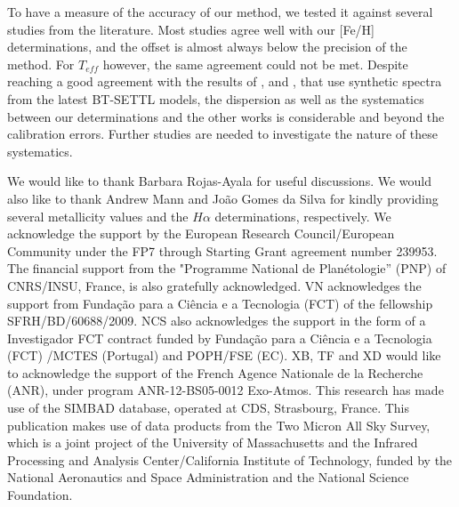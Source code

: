 \documentclass{aa}
\begin{document}
To have a measure of the accuracy of our method, we tested it against several studies from the literature. Most studies agree well with our [Fe/H] determinations, and the offset is almost always below the precision of the method. For $T_{eff}$ however, the same agreement could not be met. Despite reaching a good agreement with the results of \citet{Woolf-2005}, and \citet{Rajpurohit-2013a}, that use synthetic spectra from the latest BT-SETTL models, the dispersion as well as the systematics between our determinations and the other works is considerable and beyond the calibration errors. Further studies are needed to investigate the nature of these systematics. 










\begin{acknowledgements}
We would like to thank Barbara Rojas-Ayala for useful discussions. We would also like to thank Andrew Mann and Jo\~ao Gomes da Silva for kindly providing several metallicity values and the $H\alpha$ determinations, respectively. We acknowledge the support by the European Research Council/European Community under the FP7 through Starting Grant agreement number 239953. The financial support from the "Programme National de Plan\'etologie'' (PNP) of CNRS/INSU, France, is also gratefully acknowledged. VN acknowledges the support from Funda\c{c}\~ao para a Ci\^encia e a Tecnologia (FCT) of the fellowship SFRH/BD/60688/2009. NCS also acknowledges the support in the form of a Investigador FCT contract funded by Funda\c{c}\~ao para a Ci\^encia e a Tecnologia (FCT) /MCTES (Portugal) and POPH/FSE (EC). XB, TF and XD would like to acknowledge the support of the French Agence Nationale de la Recherche (ANR), under program ANR-12-BS05-0012 Exo-Atmos. This research has made use of the SIMBAD database, operated at CDS, Strasbourg, France. This publication makes use of data products from the Two Micron All Sky Survey, which is a joint project of the University of Massachusetts and the Infrared Processing and Analysis Center/California Institute of Technology, funded by the National Aeronautics and Space Administration and the National Science Foundation.

\end{acknowledgements}
\end{document}
